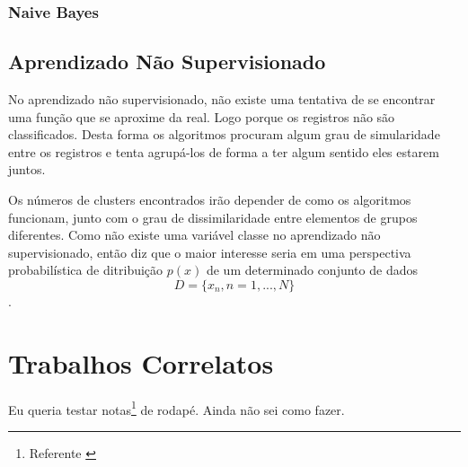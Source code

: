 \subsubsection{Naive Bayes}\label{sssec:nbayes}


\subsection{Aprendizado Não Supervisionado}\label{ssec:aprendNSup}

No aprendizado não supervisionado, não existe uma tentativa de se encontrar uma função que se aproxime da real. Logo porque os registros não são classificados. Desta forma os algoritmos procuram algum grau de simularidade entre os registros e tenta agrupá-los de forma a ter algum sentido eles estarem juntos. 

Os números de clusters encontrados irão depender de como os algoritmos funcionam, junto com o grau de dissimilaridade entre elementos de grupos diferentes. Como não existe uma variável classe no aprendizado não supervisionado, então \cite{Barber2011} diz que o maior interesse seria em uma perspectiva probabilística de ditribuição ${p(x)}$ de um determinado conjunto de dados 
\begin{equation}
 D = \{x_{n},n=1,...,N\}
 \label{eq:aprendNSup}
\end{equation}
.


\section{Trabalhos Correlatos}\label{sec:primTrab}

Eu queria testar notas\footnote{Referente \cite{Mitchell1997}  } de rodapé\cite[Seilá]{Mitchell1997}. Ainda não sei como fazer.


\lipsum[34]
